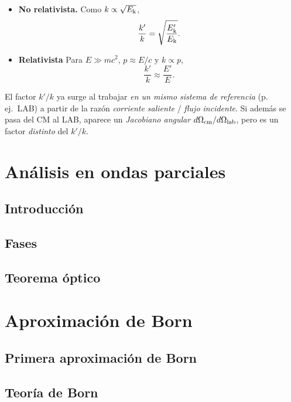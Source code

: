 \begin{itemize}
\item \textbf{No relativista.} Como $k\propto \sqrt{E_{\rm k}}$,
\begin{equation}
\frac{k'}{k}=\sqrt{\frac{E'_{\rm k}}{E_{\rm k}}}.
\end{equation}

\item \textbf{Relativista } Para $E\gg mc^2$, $p\approx E/c$ y $k\propto p$,
\begin{equation}
\frac{k'}{k}\approx \frac{E'}{E}.
\end{equation}
\end{itemize} 
El factor $k'/k$ ya surge al trabajar \emph{en un mismo sistema de referencia} (p.\,ej.\ LAB) a partir de la razón
\emph{corriente saliente} / \emph{flujo incidente}. Si además se pasa del CM al LAB, aparece un \emph{Jacobiano angular} $d\Omega_{\rm cm}/d\Omega_{\rm lab}$, pero es un factor \emph{distinto} del $k'/k$.

\section{Análisis en ondas parciales}

\subsection{Introducción}

\subsection{Fases}

\subsection{Teorema óptico}

\section{Aproximación de Born}

\subsection{Primera aproximación de Born}

\subsection{Teoría de Born}

